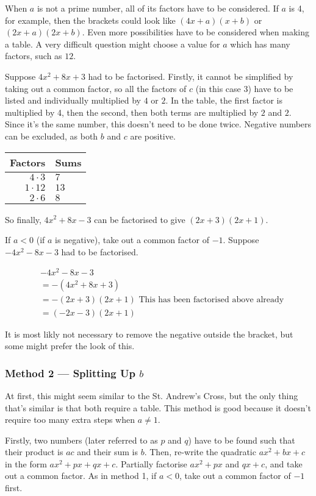 When $a$ is not a prime number, all of its factors have to be considered. If $a$ is 4, for example, then the brackets could look like $(4x+a)(x+b)$ or $(2x+a)(2x+b)$. Even more possibilities have to be considered when making a table. A very difficult question might choose a value for $a$ which has many factors, such as $12$.

Suppose $4x^2+8x+3$ had to be factorised. Firstly, it cannot be simplified by taking out a common factor, so all the factors of $c$ (in this case $3$) have to be listed and individually multiplied by $4$ or $2$. In the table, the first factor is multiplied by 4, then the second, then both terms are multiplied by $2$ and $2$. Since it's the same number, this doesn't need to be done twice. Negative numbers can be excluded, as both $b$ and $c$ are positive.

\medskip

\begin{tabular}{r | l}
	Factors & Sums\\
	\hline
	$4 \cdot 3$ & $7$\\
	\hline
	$1 \cdot 12$ & $13$\\
	\hline
	$2 \cdot 6$ & $8$\\
\end{tabular}

So finally, $4x^2+8x-3$ can be factorised to give $(2x+3)(2x+1)$.

If $a<0$ (if $a$ is negative), take out a common factor of $-1$. Suppose $-4x^2-8x-3$ had to be factorised.

\begin{align*}
	&-4x^2-8x-3\\
	&=-(4x^2+8x+3)\\
	&=-(2x+3)(2x+1)\text{ This has been factorised above already}\\
	&=(-2x-3)(2x+1)
\end{align*}

It is most likly not necessary to remove the negative outside the bracket, but some might prefer the look of this.

\subsubsection{Method 2 — Splitting Up $b$}
At first, this might seem similar to the St. Andrew's Cross, but the only thing that's similar is that both require a table. This method is good because it doesn't require too many extra steps when $a \neq 1$.

Firstly, two numbers (later referred to as $p$ and $q$) have to be found such that their product is $ac$ and their sum is $b$. Then, re-write the quadratic $ax^2+bx+c$ in the form $ax^2+px+qx+c$. Partially factorise $ax^2+px$ and $qx+c$, and take out a common factor. As in method 1, if $a<0$, take out a common factor of $-1$ first.

